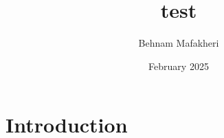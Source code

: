 \documentclass{article}
\title{test}
\author{Behnam Mafakheri}
\date{February 2025}
\begin{document}
\maketitle

\section{Introduction}
\end{document}
